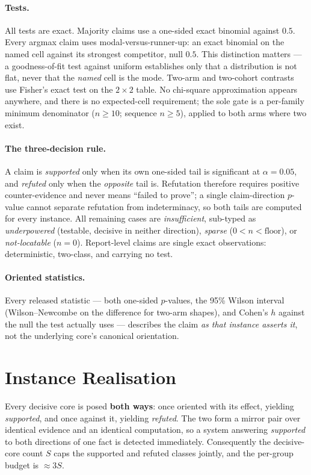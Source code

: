 \paragraph{Tests.} All tests are exact. Majority claims use a one-sided exact
binomial against $0.5$. Every argmax claim uses modal-versus-runner-up: an exact
binomial on the named cell against its strongest competitor, null $0.5$. This
distinction matters --- a goodness-of-fit test against uniform establishes only
that a distribution is not flat, never that the \emph{named} cell is the mode.
Two-arm and two-cohort contrasts use Fisher's exact test on the $2\times2$ table.
No chi-square approximation appears anywhere, and there is no expected-cell
requirement; the sole gate is a per-family minimum denominator ($n \geq 10$;
sequence $n \geq 5$), applied to both arms where two exist.

\paragraph{The three-decision rule.} A claim is \emph{supported} only when its own
one-sided tail is significant at $\alpha = 0.05$, and \emph{refuted} only when the
\emph{opposite} tail is. Refutation therefore requires positive counter-evidence
and never means ``failed to prove''; a single claim-direction $p$-value cannot
separate refutation from indeterminacy, so both tails are computed for every
instance. All remaining cases are \emph{insufficient}, sub-typed as
\emph{underpowered} (testable, decisive in neither direction), \emph{sparse}
($0 < n < \textrm{floor}$), or \emph{not-locatable} ($n = 0$). Report-level claims
are single exact observations: deterministic, two-class, and carrying no test.

\paragraph{Oriented statistics.} Every released statistic --- both one-sided
$p$-values, the 95\% Wilson interval (Wilson--Newcombe on the difference for
two-arm shapes), and Cohen's $h$ against the null the test actually uses ---
describes the claim \emph{as that instance asserts it}, not the underlying core's
canonical orientation.

\section{Instance Realisation}
\label{sec:realization}

Every decisive core is posed \textbf{both ways}: once oriented with its effect,
yielding \emph{supported}, and once against it, yielding \emph{refuted}. The two
form a mirror pair over identical evidence and an identical computation, so a
system answering \emph{supported} to both directions of one fact is detected
immediately. Consequently the decisive-core count $S$ caps the supported and
refuted classes jointly, and the per-group budget is ${\approx}3S$.

